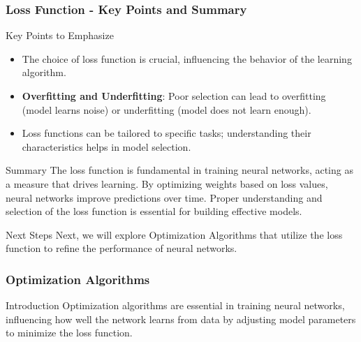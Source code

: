 \documentclass[aspectratio=169]{beamer}
\begin{document}
\begin{frame}[fragile]
    \frametitle{Loss Function - Key Points and Summary}
    \begin{block}{Key Points to Emphasize}
        \begin{itemize}
            \item The choice of loss function is crucial, influencing the behavior of the learning algorithm.
            \item \textbf{Overfitting and Underfitting}: Poor selection can lead to overfitting (model learns noise) or underfitting (model does not learn enough).
            \item Loss functions can be tailored to specific tasks; understanding their characteristics helps in model selection.
        \end{itemize}
    \end{block}

    \begin{block}{Summary}
        The loss function is fundamental in training neural networks, acting as a measure that drives learning. By optimizing weights based on loss values, neural networks improve predictions over time. Proper understanding and selection of the loss function is essential for building effective models.
    \end{block}

    \begin{block}{Next Steps}
        Next, we will explore Optimization Algorithms that utilize the loss function to refine the performance of neural networks.
    \end{block}
\end{frame}

\begin{frame}[fragile]
    \frametitle{Optimization Algorithms}
    \begin{block}{Introduction}
        Optimization algorithms are essential in training neural networks, influencing how well the network learns from data by adjusting model parameters to minimize the loss function.
    \end{block}
\end{frame}
\end{document}
